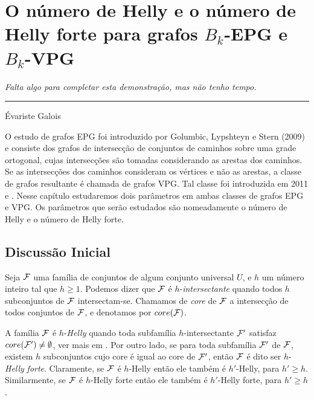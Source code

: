 \chapter{O número de Helly e o número de Helly forte para grafos $B_k$-EPG e $B_k$-VPG}


\begin{flushright}
\begin{minipage}[t][0cm][b]{0.47\textwidth}
\emph{
Falta algo para completar esta demonstração, mas não tenho tempo.}
\end{minipage}

\rule[0cm]{7cm}{0.03cm}%

Évariste Galois
\end{flushright}




O estudo de grafos EPG foi introduzido por  Golumbic, Lypshteyn e Stern (2009) e consiste dos grafos de intersecção de conjuntos de caminhos sobre uma grade ortogonal, cujas intersecções são tomadas considerando as arestas dos caminhos. Se as intersecções dos caminhos consideram os vértices e não as arestas, a classe de grafos resultante é chamada de grafos VPG. Tal classe foi introduzida em 2011 \cite{asinowski2011string} e \cite{asinowski2012}. Nesse capítulo estudaremos dois parâmetros em ambas classes de grafos EPG e VPG. Os parâmetros que serão estudados são nomeadamente o número de Helly e o número de Helly forte.

\section{Discussão Inicial}

Seja  $\cal {F}$ uma família de conjuntos de algum conjunto universal $U$, e $h$ um número inteiro tal que $h\geq 1$. Podemos dizer que $\cal{F}$ é $h$-{\it intersectante} quando todos  $h$ subconjuntos de $\cal {F}$ intersectam-se. Chamamos de {\it core} de $\cal {F}$ a intersecção de todos conjuntos de $\cal {F}$, e denotamos por $core(\cal F)$. 

A família $\cal{F}$ é $h$-{\it Helly} quando toda subfamília $h$-intersectante $\cal{F'}$ satisfaz $core(\cal{F'}) \neq \emptyset$, ver mais em \cite{duchet1978propriete}. Por outro lado, se para toda subfamília $\cal{F'}$ de $\cal{F}$, existem $h$ subconjuntos cujo core é igual ao core de  $\cal {F'}$, então $\cal {F}$ é dito ser  $h$-{\it Helly} {\it forte}. Claramente, se $\cal {F}$ é $h$-Helly então ele também é $h'$-Helly, para $h' \geq h$. Similarmente, se ${\cal F}$ é $h$-Helly forte então ele também é $h'$-Helly forte, para $h' \geq h$. 

